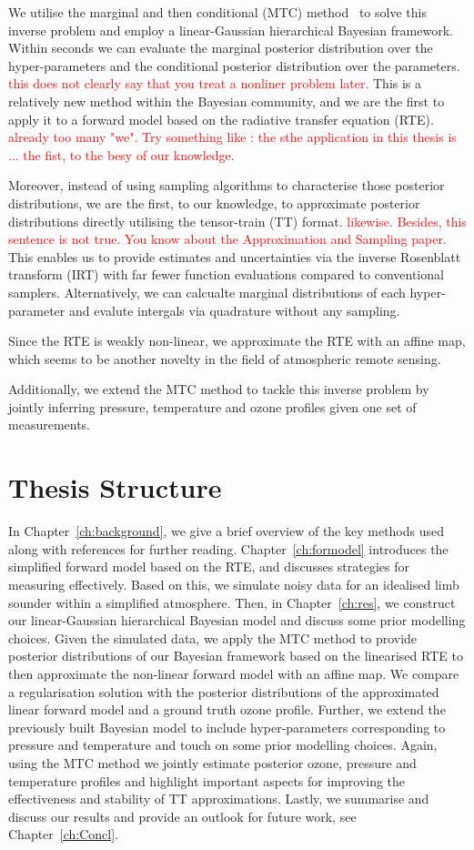 We utilise the marginal and then conditional (MTC) method~\cite{fox2016fast} to solve this inverse problem and employ a linear-Gaussian hierarchical Bayesian framework.
Within seconds we can evaluate the marginal posterior distribution over the hyper-parameters and the conditional posterior distribution over the parameters. \textcolor{red}{this does not clearly say that you treat a nonliner problem later.}
This is a relatively new method within the Bayesian community, and we are the first to apply it to a forward model based on the radiative transfer equation (RTE). \textcolor{red}{already too many "we". Try something like : the sthe application in this thesis is ... the fist, to the besy of our knowledge.}

Moreover, instead of using sampling algorithms to characterise those posterior distributions, we are the first, to our knowledge, to approximate posterior distributions directly utilising the tensor-train (TT) format. \textcolor{red}{likewise. Besides, this sentence is not true. You know about the Approximation and Sampling paper.}
This enables us to provide estimates and uncertainties via the inverse Rosenblatt transform (IRT) with far fewer function evaluations compared to conventional samplers.
Alternatively, we can calcualte marginal distributions of each hyper-parameter and evalute intergals via quadrature without any sampling.

Since the RTE is weakly non-linear, we approximate the RTE with an affine map, which seems to be another novelty in the field of atmospheric remote sensing.

Additionally, we extend the MTC method to tackle this inverse problem by jointly inferring pressure, temperature and ozone profiles given one set of measurements.


\section{Thesis Structure}
In Chapter~\ref{ch:background}, we give a brief overview of the key methods used along with references for further reading.
Chapter~\ref{ch:formodel} introduces the simplified forward model based on the RTE, and discusses strategies for measuring effectively.
Based on this, we simulate noisy data for an idealised limb sounder within a simplified atmosphere.
Then, in Chapter~\ref{ch:res}, we construct our linear-Gaussian hierarchical Bayesian model and discuss some prior modelling choices.
Given the simulated data, we apply the MTC method to provide posterior distributions of our Bayesian framework based on the linearised RTE to then approximate the non-linear forward model with an affine map. 
We compare a regularisation solution with the posterior distributions of the approximated linear forward model and a ground truth ozone profile.
Further, we extend the previously built Bayesian model to include hyper-parameters corresponding to pressure and temperature and touch on some prior modelling choices. 
Again, using the MTC method we jointly estimate posterior ozone, pressure and temperature profiles and highlight important aspects for improving the effectiveness and stability of TT approximations.
Lastly, we summarise and discuss our results and provide an outlook for future work, see Chapter~\ref{ch:Concl}.

